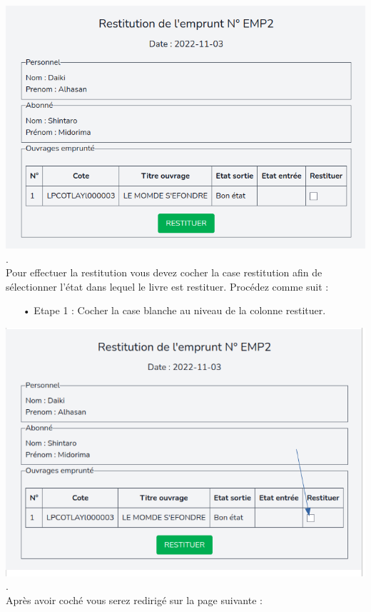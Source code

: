 \documentclass[12pt,a4paper]{article}
\begin{document}
\includegraphics[scale=0.5]{images/Restitution.png}.\\

Pour effectuer la restitution vous devez cocher la case restitution afin de sélectionner l'état dans lequel le livre est restituer. Procédez comme suit :

\begin{itemize}
\item[•] Etape 1 : Cocher la case blanche au niveau de la colonne restituer.\\
\end{itemize}

\includegraphics[scale=0.5]{images/Cocher.png}.\\

\newpage
Après avoir coché vous serez redirigé sur la page suivante : \\
\end{document}

